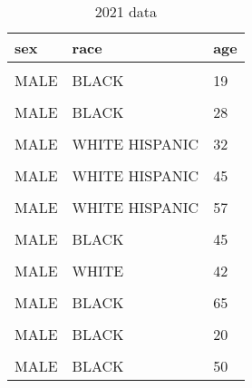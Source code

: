 \documentclass[
  letterpaper,
  DIV=11,
  numbers=noendperiod]{scrartcl}
\begin{document}
\begin{table}

\caption{2021 data}
\centering
\begin{tabular}[t]{lll}
\toprule
sex & race & age\\
\midrule
\cellcolor{gray!6}{MALE} & \cellcolor{gray!6}{BLACK} & \cellcolor{gray!6}{40}\\
MALE & BLACK & \vphantom{1} 19\\
\cellcolor{gray!6}{MALE} & \cellcolor{gray!6}{ASIAN / PACIFIC ISLANDER} & \cellcolor{gray!6}{(null)}\\
MALE & BLACK & 28\\
\cellcolor{gray!6}{MALE} & \cellcolor{gray!6}{BLACK} & \cellcolor{gray!6}{19}\\
\addlinespace
MALE & WHITE HISPANIC & 32\\
\cellcolor{gray!6}{MALE} & \cellcolor{gray!6}{BLACK} & \cellcolor{gray!6}{32}\\
MALE & WHITE HISPANIC & 45\\
\cellcolor{gray!6}{MALE} & \cellcolor{gray!6}{BLACK} & \cellcolor{gray!6}{27}\\
MALE & WHITE HISPANIC & 57\\
\addlinespace
\cellcolor{gray!6}{MALE} & \cellcolor{gray!6}{BLACK} & \cellcolor{gray!6}{(null)}\\
MALE & BLACK & 45\\
\cellcolor{gray!6}{MALE} & \cellcolor{gray!6}{WHITE HISPANIC} & \cellcolor{gray!6}{17}\\
MALE & WHITE & 42\\
\cellcolor{gray!6}{MALE} & \cellcolor{gray!6}{WHITE HISPANIC} & \cellcolor{gray!6}{43}\\
\addlinespace
MALE & BLACK & 65\\
\cellcolor{gray!6}{MALE} & \cellcolor{gray!6}{WHITE HISPANIC} & \cellcolor{gray!6}{30}\\
MALE & BLACK & \vphantom{1} 20\\
\cellcolor{gray!6}{MALE} & \cellcolor{gray!6}{BLACK} & \cellcolor{gray!6}{20}\\
MALE & BLACK & 50\\
\bottomrule
\end{tabular}
\end{table}

\newpage
\end{document}
